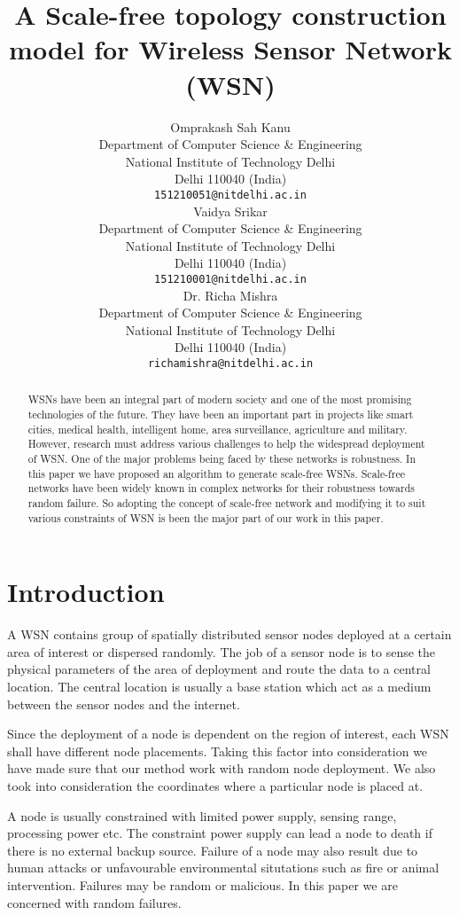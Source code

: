 \documentclass{article}
\title{A Scale-free topology construction model for Wireless Sensor Network (WSN)}
\author{
  Omprakash Sah Kanu \\
  Department of Computer Science \& Engineering\\
  National Institute of Technology Delhi \\
  Delhi 110040 (India)\\
  \texttt{151210051@nitdelhi.ac.in} \\
   \And
 Vaidya Srikar \\
  Department of Computer Science \& Engineering\\
  National Institute of Technology Delhi \\
  Delhi 110040 (India)\\
  \texttt{151210001@nitdelhi.ac.in} \\
  \And
   Dr. Richa Mishra\\
    Department of Computer Science \& Engineering\\
  National Institute of Technology Delhi \\
  Delhi 110040 (India)\\
  \texttt{richamishra@nitdelhi.ac.in} \\
}
\begin{document}
\maketitle

\begin{abstract}
WSNs have been an integral part of modern society and one of the most promising technologies of the future. They have been an important part in projects like smart cities, medical health, intelligent home, area surveillance, agriculture and military. However, research must address various challenges to help the widespread deployment of WSN. One of the major problems being faced by these networks is robustness. In this paper we have proposed an algorithm to generate scale-free WSNs. Scale-free networks have been widely known in complex networks for their robustness towards random failure. So adopting the concept of scale-free network and modifying it to suit various constraints of WSN is been the major part of our work in this paper. 
\end{abstract}




\section{Introduction}
A WSN contains group of spatially distributed sensor nodes deployed at a certain area of interest or dispersed randomly. The job of a sensor node is to sense the physical parameters of the area of deployment and route the data to a central location. The central location is usually a base station which act as a medium between the sensor nodes and the internet. 

Since the deployment of a node is dependent on the region of interest, each WSN shall have different node placements. Taking this factor into consideration we have made sure that our method work with random node deployment. We also took into consideration the coordinates where a particular node is placed at.    

A node is usually constrained with limited power supply, sensing range, processing power etc. The constraint power supply can lead a node to death if there is no external backup source. Failure of a node may also result due to human attacks or unfavourable environmental situtations such as fire or animal intervention. Failures may be random or malicious. In this paper we are concerned with random failures.
\end{document}
